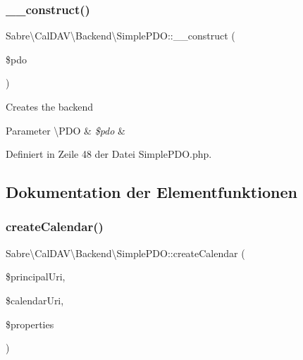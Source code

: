 \subsubsection{\texorpdfstring{\+\_\+\+\_\+construct()}{\_\_construct()}}
{\footnotesize\ttfamily Sabre\textbackslash{}\+Cal\+D\+A\+V\textbackslash{}\+Backend\textbackslash{}\+Simple\+P\+D\+O\+::\+\_\+\+\_\+construct (\begin{DoxyParamCaption}\item[{\textbackslash{}\mbox{\hyperlink{class_sabre_1_1_cal_d_a_v_1_1_backend_1_1_p_d_o}{P\+DO}}}]{\$pdo }\end{DoxyParamCaption})}

Creates the backend


\begin{DoxyParams}[1]{Parameter}
\textbackslash{}\+P\+DO & {\em \$pdo} & \\
\hline
\end{DoxyParams}


Definiert in Zeile 48 der Datei Simple\+P\+D\+O.\+php.



\subsection{Dokumentation der Elementfunktionen}
\mbox{\label{class_sabre_1_1_cal_d_a_v_1_1_backend_1_1_simple_p_d_o_ae765390abf75b7111396a55e13fa965f}} 
\subsubsection{\texorpdfstring{create\+Calendar()}{createCalendar()}}
{\footnotesize\ttfamily Sabre\textbackslash{}\+Cal\+D\+A\+V\textbackslash{}\+Backend\textbackslash{}\+Simple\+P\+D\+O\+::create\+Calendar (\begin{DoxyParamCaption}\item[{}]{\$principal\+Uri,  }\item[{}]{\$calendar\+Uri,  }\item[{array}]{\$properties }\end{DoxyParamCaption})}

